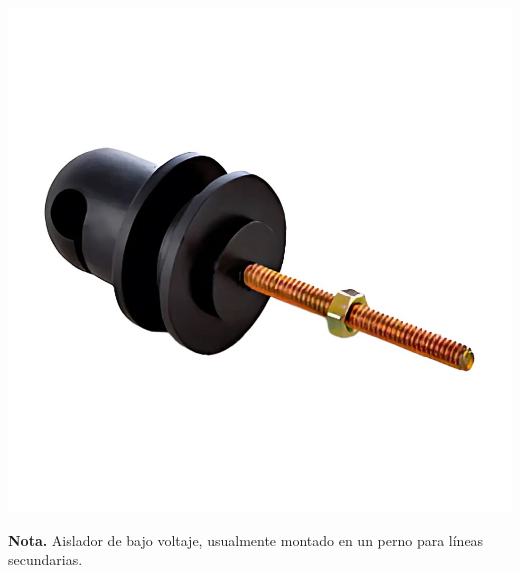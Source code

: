 \begin{minipage}[t]{0.48\textwidth} %
    \centering
    \includegraphics[width=\linewidth]{fotosherrajes/aislador de perno.jpg}
    \footnotesize
    \raggedright
    \textbf{Nota.} Aislador de bajo voltaje, usualmente montado en un perno para líneas secundarias.
\end{minipage}

\vspace{1cm} %

